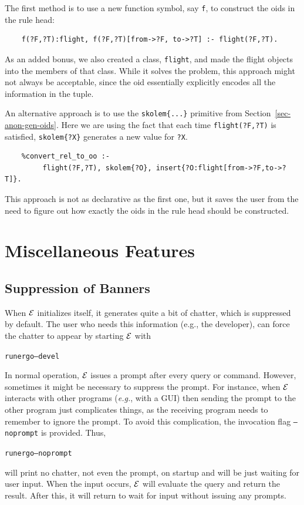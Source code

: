 \documentclass[11pt]{article}
\newcommand{\ERGO}{\mbox{\ensuremath{\cal{E}}\smaller{{\sc{RGO}}}}\xspace}
\newcommand{\FLSYSTEM}{\ERGO}
\newcommand{\ENGINERUN}{runergo}
\begin{document}
The first method is to use a new function symbol, say {\tt f}, to construct
the oids in the rule head:
\begin{verbatim}
    f(?F,?T):flight, f(?F,?T)[from->?F, to->?T] :- flight(?F,?T).  
\end{verbatim}
As an added bonus, we also created a class, {\tt flight}, and made the
flight objects into the members of that class. 
While it solves the problem, this approach might not always be acceptable,
since the oid essentially explicitly encodes all the information in the tuple.

An alternative approach is to use the {\tt skolem\{...\}} primitive from
Section~\ref{sec-anon-gen-oids}. Here we are using the fact that each time
{\tt flight(?F,?T)} is satisfied, {\tt skolem\{?X\}} generates a new value for
{\tt ?X}.    
\begin{verbatim}
    %convert_rel_to_oo :-
         flight(?F,?T), skolem{?O}, insert{?O:flight[from->?F,to->?T]}.
\end{verbatim}
This approach is not as declarative as the first one, but it saves the user
from the need to figure out how exactly the oids in the rule head should be
constructed.


\section{Miscellaneous Features}

\subsection{Suppression of Banners}
When \FLSYSTEM initializes itself, it generates quite a bit of chatter,
which is suppressed by default. The user who needs this information (e.g.,
the developer), can force the chatter to appear by starting \FLSYSTEM with
\begin{alltt}
 \ENGINERUN --devel
\end{alltt}

In normal operation, \FLSYSTEM issues a prompt after every query or
command. However, sometimes it might be necessary to suppress the prompt.
For instance, when \FLSYSTEM
interacts with other programs ({\it e.g.}, with a GUI) then sending the
prompt to the other program just complicates things, as the receiving
program needs to remember to ignore the prompt. To avoid this complication,
the invocation flag {\tt --noprompt} is provided. Thus,
\begin{alltt}
 \ENGINERUN --noprompt
\end{alltt}
will print no chatter, not even the prompt,
on startup and will be just waiting for user input. When
the input occurs, \FLSYSTEM will evaluate the query and return the result.
After this, it will return to wait for input without issuing any
prompts.
\end{document}

